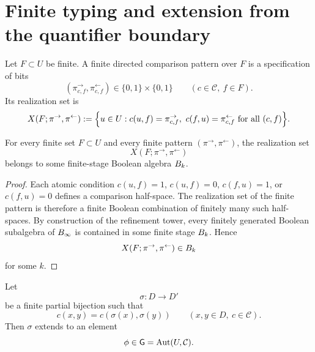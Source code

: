 \section{Finite typing and extension from the quantifier boundary}
\label{sec:einstein-extension}
\begin{definition}
	Let \(F\subset U\) be finite.
	A finite directed comparison pattern over \(F\) is a specification of
	bits
	\[
		(\pi^\rightarrow_{c,f},\pi^\leftarrow_{c,f})\in\{0,1\}\times\{0,1\}
		\qquad
		(c\in\mathcal C,\ f\in F).
	\]
	Its realization set is
	\[
		X(F;\pi^\rightarrow,\pi^\leftarrow)
		:=
		\Bigl\{
		u\in U:
		c(u,f)=\pi^\rightarrow_{c,f},\
		c(f,u)=\pi^\leftarrow_{c,f}
		\text{ for all }(c,f)
		\Bigr\}.
	\]
\end{definition}
\begin{lemma}
	\label{lem:einstein-typing}
	For every finite set \(F\subset U\) and every finite pattern
	\((\pi^\rightarrow,\pi^\leftarrow)\), the realization set
	\[
		X(F;\pi^\rightarrow,\pi^\leftarrow)
	\]
	belongs to some finite-stage Boolean algebra \(B_k\).
\end{lemma}
\begin{proof}
	Each atomic condition \(c(u,f)=1\), \(c(u,f)=0\), \(c(f,u)=1\), or
	\(c(f,u)=0\) defines a comparison half-space.
	The realization set of the finite pattern is therefore a finite Boolean
	combination of finitely many such half-spaces.
	By construction of the refinement tower, every finitely generated
	Boolean subalgebra of \(B_\infty\) is contained in some finite stage
	\(B_k\).
	Hence
	\[
		X(F;\pi^\rightarrow,\pi^\leftarrow)\in B_k
	\]
	for some \(k\).
\end{proof}
\begin{theorem}
	\label{thm:einstein-extension}
	Let
	\[
		\sigma:D\to D'
	\]
	be a finite partial bijection such that
	\[
		c(x,y)=c(\sigma(x),\sigma(y))
		\qquad
		(x,y\in D,\ c\in\mathcal C).
	\]
	Then \(\sigma\) extends to an element
	\[
		\phi\in \mathsf G=\operatorname{Aut}(U,\mathcal C).
	\]
\end{theorem}
